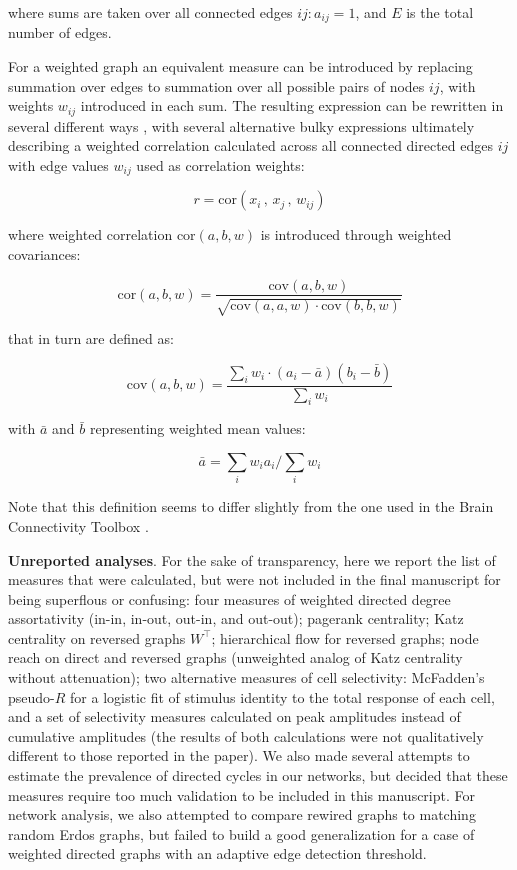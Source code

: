 \documentclass{article}
\begin{document}
where sums are taken over all connected edges $ij: a_{ij}=1$, and $E$ is the total number of edges.

For a weighted graph an equivalent measure can be introduced by replacing summation over edges to summation over all possible pairs of nodes $ij$, with weights $w_{ij}$ introduced in each sum. The resulting expression can be rewritten in several different ways \citep{newman2003mixing,leung2007weighted,farine2014weighted,teller2014assortative}, with several alternative bulky expressions ultimately describing a weighted correlation calculated across all connected directed edges $ij$ with edge values $w_{ij}$ used as correlation weights:

\[ r=\text{cor}(x_i \, , \, x_j \, , \, w_{ij}) \]

where weighted correlation $\text{cor}(a,b,w)$ is introduced through weighted covariances: 

\[ \text{cor}(a,b,w) = \frac{\text{cov}(a,b,w)}{\sqrt{\text{cov}(a,a,w) \cdot \text{cov}(b,b,w)}} \]

that in turn are defined as: 

\[ \text{cov}(a,b,w) = \frac{\sum_i{w_i \cdot (a_i-\bar{a})(b_i-\bar{b})}}{\sum_i{w_i}} \]

with $\bar{a}$ and $\bar{b}$ representing weighted mean values: 

\[ \bar{a}=\sum_i{w_i a_i}/\sum_i{w_i} \]

Note that this definition seems to differ slightly from the one used in the Brain Connectivity Toolbox \citep{rubinov2010toolbox}.

\textbf{Unreported analyses}. For the sake of transparency, here we report the list of measures that were calculated, but were not included in the final manuscript for being superflous or confusing: four measures of weighted directed degree assortativity (in-in, in-out, out-in, and out-out); pagerank centrality; Katz centrality on reversed graphs $W^\top$; hierarchical flow for reversed graphs; node reach on direct and reversed graphs (unweighted analog of Katz centrality without attenuation); two alternative measures of cell selectivity: McFadden’s pseudo-$R$ for a logistic fit of stimulus identity to the total response of each cell, and a set of selectivity measures calculated on peak amplitudes instead of cumulative amplitudes (the results of both calculations were not qualitatively different to those reported in the paper). We also made several attempts to estimate the prevalence of directed cycles in our networks, but decided that these measures require too much validation to be included in this manuscript. For network analysis, we also attempted to compare rewired graphs to matching random Erdos graphs, but failed to build a good generalization for a case of weighted directed graphs with an adaptive edge detection threshold.
\end{document}
